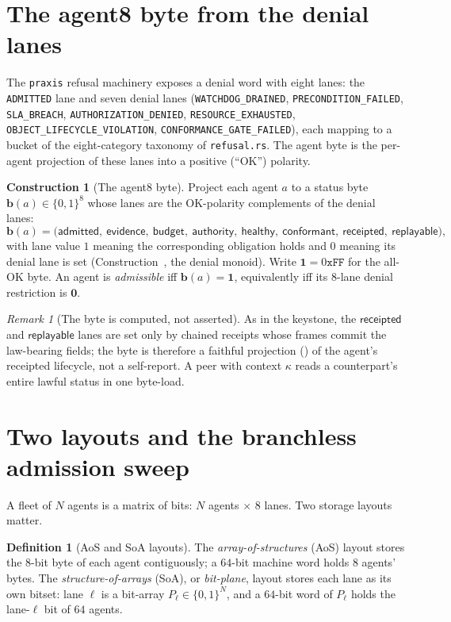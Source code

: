 \documentclass[11pt,oneside]{book}
\theoremstyle{definition}
\newtheorem{definition}{Definition}[chapter]
\newtheorem{construction}{Construction}[chapter]
\theoremstyle{plain}
\theoremstyle{remark}
\newtheorem*{remark}{Remark}
\newcommand{\CL}{\kappa}                       %
\newcommand{\code}[1]{\texttt{#1}}
\newcommand{\abyte}{\mathbf{b}}                %
\newcommand{\lane}[1]{\ensuremath{\mathsf{#1}}}
\begin{document}
\section{The agent8 byte from the denial lanes}

The \code{praxis} refusal machinery exposes a denial word with eight lanes: the \code{ADMITTED}
lane and seven denial lanes (\code{WATCHDOG\_DRAINED}, \code{PRECONDITION\_FAILED},
\code{SLA\_BREACH}, \code{AUTHORIZATION\_DENIED}, \code{RESOURCE\_EXHAUSTED},
\code{OBJECT\_LIFECYCLE\_VIOLATION}, \code{CONFORMANCE\_GATE\_FAILED}), each mapping to a bucket of
the eight-category taxonomy of \code{refusal.rs}. The agent byte is the per-agent projection of
these lanes into a positive (``OK'') polarity.

\begin{construction}[The agent8 byte]\label{con:agent8}
Project each agent $a$ to a status byte $\abyte(a)\in\{0,1\}^{8}$ whose lanes are the OK-polarity
complements of the denial lanes:
\[
\abyte(a)=\bigl(\lane{admitted},\ \lane{evidence},\ \lane{budget},\ \lane{authority},\ \lane{healthy},\ \lane{conformant},\ \lane{receipted},\ \lane{replayable}\bigr),
\]
with lane value $1$ meaning the corresponding obligation holds and $0$ meaning its denial lane is
set (Construction~\cite[Con.~2.1]{keystone}, the denial monoid). Write $\mathbf 1=0\mathtt{xFF}$
for the all-OK byte. An agent is \emph{admissible} iff $\abyte(a)=\mathbf 1$, equivalently iff its
$8$-lane denial restriction is $\bm 0$.
\end{construction}

\begin{remark}[The byte is computed, not asserted]
As in the keystone, the \lane{receipted} and \lane{replayable} lanes are set only by chained
receipts whose frames commit the law-bearing fields; the byte is therefore a faithful projection
(\cite[Thm.~3.2]{keystone}) of the agent's receipted lifecycle, not a self-report. A peer with
context $\CL$ reads a counterpart's entire lawful status in one byte-load.
\end{remark}

\section{Two layouts and the branchless admission sweep}

A fleet of $N$ agents is a matrix of bits: $N$ agents $\times$ $8$ lanes. Two storage layouts
matter.

\begin{definition}[AoS and SoA layouts]\label{def:layouts}
The \emph{array-of-structures} (AoS) layout stores the $8$-bit byte of each agent contiguously; a
$64$-bit machine word holds $8$ agents' bytes. The \emph{structure-of-arrays} (SoA), or
\emph{bit-plane}, layout stores each lane as its own bitset: lane $\ell$ is a bit-array
$P_\ell\in\{0,1\}^{N}$, and a $64$-bit word of $P_\ell$ holds the lane-$\ell$ bit of $64$ agents.
\end{definition}
\end{document}
